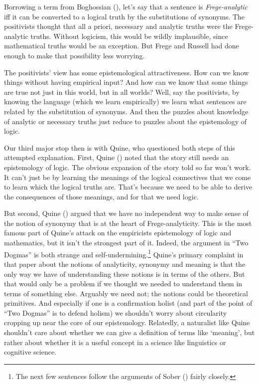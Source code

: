 \documentclass[
  11pt,
  letterpaper,
  DIV=11,
  numbers=noendperiod,
  twoside]{scrartcl}
\begin{document}
Borrowing a term from Boghossian
(), let's say that a sentence
is \emph{Frege-analytic} iff it can be converted to a logical truth by
the substitutions of synonyms. The positivists thought that all a
priori, necessary and analytic truths were the Frege-analytic truths.
Without logicism, this would be wildly implausible, since mathematical
truths would be an exception. But Frege and Russell had done enough to
make that possibility less worrying.

The positivists' view has some epistemological attractiveness. How can
we know things without having empirical input? And how can we know that
some things are true not just in this world, but in all worlds? Well,
say the positivists, by knowing the language (which we learn
empirically) we learn what sentences are related by the substitution of
synonyms. And then the puzzles about knowledge of analytic or necessary
truths just reduce to puzzles about the epistemology of logic.

Our third major stop then is with Quine, who questioned both steps of
this attempted explanation. First, Quine
() noted that the story still
needs an epistemology of logic. The obvious expansion of the story told
so far won't work. It can't just be by learning the meanings of the
logical connectives that we come to learn which the logical truths are.
That's because we need to be able to derive the consequences of those
meanings, and for that we need logic.

But second, Quine () argued that we
have no independent way to make sense of the notion of synonymy that is
at the heart of Frege-analyticity. This is the most famous part of
Quine's attack on the empiricists epistemology of logic and mathematics,
but it isn't the strongest part of it. Indeed, the argument in ``Two
Dogmas'' is both strange and self-undermining.\footnote{The next few
  sentences follow the arguments of Sober
  () fairly closely.} Quine's primary
complaint in that paper about the notions of analyticity, synonymy and
meaning is that the only way we have of understanding these notions is
in terms of the others. But that would only be a problem if we thought
we needed to understand them in terms of something else. Arguably we
need not; the notions could be theoretical primitives. And especially if
one is a confirmation holist (and part of the point of ``Two Dogmas'' is
to defend holism) we shouldn't worry about circularity cropping up near
the core of our epistemology. Relatedly, a naturalist like Quine
shouldn't care about whether we can give a definition of terms like
`meaning', but rather about whether it is a useful concept in a science
like linguistics or cognitive science.
\end{document}
